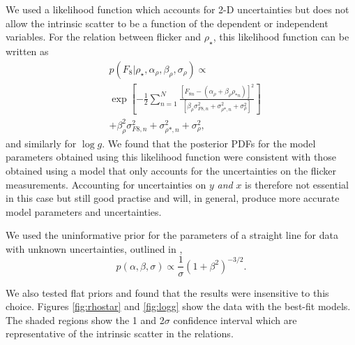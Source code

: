 \documentclass[apjl]{emulateapj}
\newcommand{\logg}{$\log g$}
\newcommand{\rhostar}{$\rho_{\star}$}
\begin{document}
We used a likelihood function which accounts for 2-D uncertainties but does
not allow the intrinsic scatter to be a function of the dependent or
independent variables.
For the relation between flicker and \rhostar, this likelihood function can be
written as
\begin{eqnarray}
	& p(F_8|\rho_\star, \alpha_\rho, \beta_\rho, \sigma_{\rho}) \propto  \\ \nonumber
						      & \exp \left[-\frac{1}{2}
		\sum_{n=1}^N \frac{[F_{8n}-(\alpha_\rho + \beta_\rho \rho_{*n})]^2}
	{\left[\beta_\rho \sigma_{F8, n}^2 + \sigma_{\rho *, n}^2
	+ \sigma_{\rho}^2\right]}\right]
	\\ \nonumber
	& + \beta_\rho^2 \sigma_{F8, n}^2 + \sigma_{\rho *, n}^2 + \sigma_{\rho}^2,
\end{eqnarray}
\label{eq:likelihood}
and similarly for \logg.
We found that the posterior PDFs for the model parameters obtained using this
likelihood function were consistent with those obtained using a model that
only accounts for the uncertainties on the flicker measurements.
Accounting for uncertainties on $y$ {\it and} $x$ is therefore not essential
in this case but still good practise and will, in general, produce more
accurate model parameters and uncertainties.


We used the uninformative prior for the parameters of a straight line for
data with unknown uncertainties, outlined in \citet{vanderplas},
\begin{equation}
p(\alpha, \beta, \sigma) \propto \frac{1}{\sigma} \left( 1 + \beta^2
\right)^{-3/2}.
\end{equation}
\label{eq:priors}


We also tested flat priors and found that the results were insensitive to this
choice.
Figures \ref{fig:rhostar} and \ref{fig:logg} show the data with the best-fit
models.
The shaded regions show the 1 and 2$\sigma$ confidence interval which are
representative of the intrinsic scatter in the relations.
\end{document}

